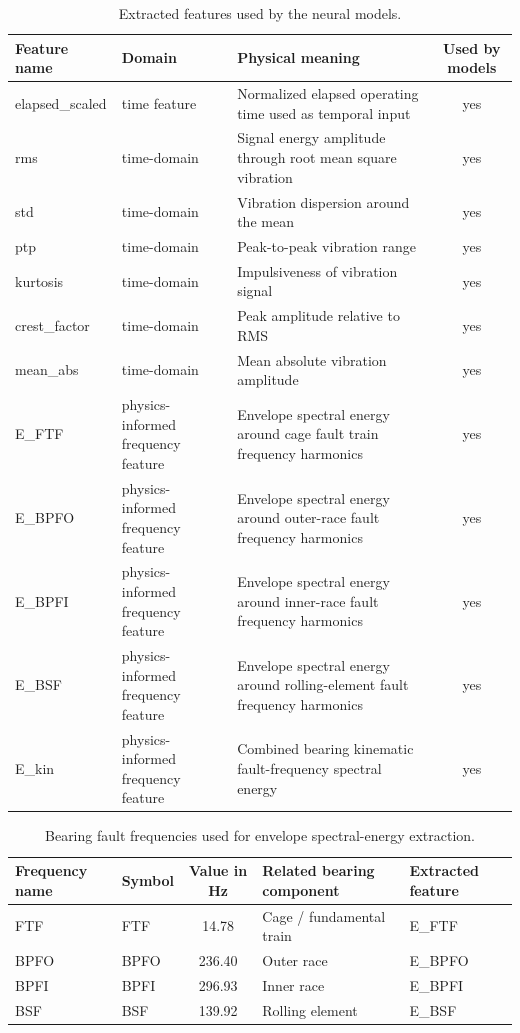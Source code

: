 \begin{table}[htbp]
    \centering
    \scriptsize
    \renewcommand{\arraystretch}{1.25}
    \caption{Extracted features used by the neural models.}
    \label{tab:feature_set}
    \begin{tabularx}{\textwidth}{@{}l l Y c@{}}
        \toprule
        Feature name & Domain & Physical meaning & Used by models \\
        \midrule
        elapsed\_scaled & time feature & Normalized elapsed operating time used as temporal input & yes \\
        rms & time-domain & Signal energy amplitude through root mean square vibration & yes \\
        std & time-domain & Vibration dispersion around the mean & yes \\
        ptp & time-domain & Peak-to-peak vibration range & yes \\
        kurtosis & time-domain & Impulsiveness of vibration signal & yes \\
        crest\_factor & time-domain & Peak amplitude relative to RMS & yes \\
        mean\_abs & time-domain & Mean absolute vibration amplitude & yes \\
        E\_FTF & physics-informed frequency feature & Envelope spectral energy around cage fault train frequency harmonics & yes \\
        E\_BPFO & physics-informed frequency feature & Envelope spectral energy around outer-race fault frequency harmonics & yes \\
        E\_BPFI & physics-informed frequency feature & Envelope spectral energy around inner-race fault frequency harmonics & yes \\
        E\_BSF & physics-informed frequency feature & Envelope spectral energy around rolling-element fault frequency harmonics & yes \\
        E\_kin & physics-informed frequency feature & Combined bearing kinematic fault-frequency spectral energy & yes \\
        \bottomrule
    \end{tabularx}
\end{table}
\FloatBarrier\begin{table}[htbp]
    \centering
    \small
    \renewcommand{\arraystretch}{1.25}
    \caption{Bearing fault frequencies used for envelope spectral-energy extraction.}
    \label{tab:fault_frequencies}
    \begin{tabularx}{\textwidth}{@{}l l c Y l@{}}
        \toprule
        Frequency name & Symbol & Value in Hz & Related bearing component & Extracted feature \\
        \midrule
        FTF & FTF & 14.78 & Cage / fundamental train & E\_FTF \\
        BPFO & BPFO & 236.40 & Outer race & E\_BPFO \\
        BPFI & BPFI & 296.93 & Inner race & E\_BPFI \\
        BSF & BSF & 139.92 & Rolling element & E\_BSF \\
        \bottomrule
    \end{tabularx}
\end{table}
